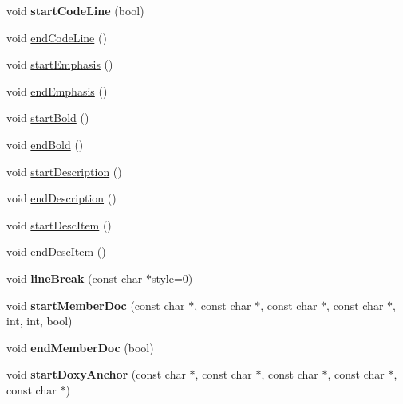 \begin{DoxyCompactItemize}
\item 
\mbox{\label{class_r_t_f_generator_abd342f1207b80ca7ef8badcf659a0b58}} 
void {\bfseries start\+Code\+Line} (bool)
\item 
void \mbox{\hyperlink{class_r_t_f_generator_a3f63e2fedfb61f656e35df2054a6d772}{end\+Code\+Line}} ()
\item 
void \mbox{\hyperlink{class_r_t_f_generator_a235071d9e43bed7dabaec79e88bf43c7}{start\+Emphasis}} ()
\item 
void \mbox{\hyperlink{class_r_t_f_generator_a283896a8d13cd017f4b765d82ba1e132}{end\+Emphasis}} ()
\item 
void \mbox{\hyperlink{class_r_t_f_generator_acb774060df0aaad9be8f91018503b20b}{start\+Bold}} ()
\item 
void \mbox{\hyperlink{class_r_t_f_generator_a430a7df863505527d0b1da4c70116a05}{end\+Bold}} ()
\item 
void \mbox{\hyperlink{class_r_t_f_generator_a9c6c7896f2bd09fb5e6ce53b9e6cee5c}{start\+Description}} ()
\item 
void \mbox{\hyperlink{class_r_t_f_generator_a4c9b42e803206c575f464d82eec460d9}{end\+Description}} ()
\item 
void \mbox{\hyperlink{class_r_t_f_generator_a39ef721382a2a25ef0a41463a34f1b02}{start\+Desc\+Item}} ()
\item 
void \mbox{\hyperlink{class_r_t_f_generator_aaeb8cbfab437b4198548c4f06dc12847}{end\+Desc\+Item}} ()
\item 
\mbox{\label{class_r_t_f_generator_aac2aff06973207c6c7e5b2e5f1984482}} 
void {\bfseries line\+Break} (const char $\ast$style=0)
\item 
\mbox{\label{class_r_t_f_generator_a6f6e7673e5d5b3005bf9893cf7eaa392}} 
void {\bfseries start\+Member\+Doc} (const char $\ast$, const char $\ast$, const char $\ast$, const char $\ast$, int, int, bool)
\item 
\mbox{\label{class_r_t_f_generator_abebabde334843d95b88db4521ea89ead}} 
void {\bfseries end\+Member\+Doc} (bool)
\item 
\mbox{\label{class_r_t_f_generator_a502ee48a2bb36ef2f0891dc5e48d30f8}} 
void {\bfseries start\+Doxy\+Anchor} (const char $\ast$, const char $\ast$, const char $\ast$, const char $\ast$, const char $\ast$)

\end{DoxyCompactItemize}
